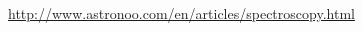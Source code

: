 \begin{thebibliography}{99}
\label{sec:ref}

	\url{http://www.astronoo.com/en/articles/spectroscopy.html}
	
	
	
	
\end{thebibliography}
